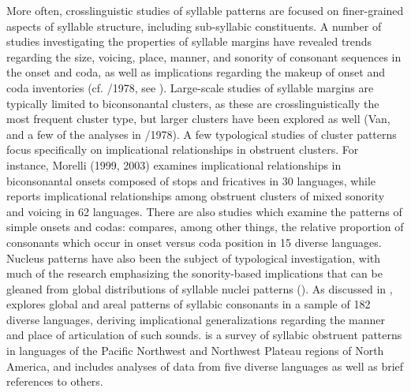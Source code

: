   More often, crosslinguistic studies of syllable patterns are focused on finer-grained aspects of syllable structure, including sub-syllabic constituents. A number of studies investigating the properties of syllable margins have revealed trends regarding the size, voicing, place, manner, and sonority of consonant sequences in the onset and coda, as well as implications regarding the makeup of onset and coda inventories (cf. \citealt{Greenberg1965}/1978, see ). Large-scale studies of syllable margins are typically limited to biconsonantal clusters, as these are crosslinguistically the most frequent cluster type, but larger clusters have been explored as well (Van\citealt{Dam2004}, and a few of the analyses in \citealt{Greenberg1965}/1978). A few typological studies of cluster patterns focus specifically on implicational relationships in obstruent clusters. For instance, Morelli (1999, 2003) examines implicational relationships in biconsonantal onsets composed of stops and fricatives in 30 languages, while \citet{Kreitman2008} reports implicational relationships among obstruent clusters of mixed sonority and voicing in 62 languages. There are also studies which examine the patterns of simple onsets and codas: \citet{Rousset2004} compares, among other things, the relative proportion of consonants which occur in onset versus coda position in 15 diverse languages. Nucleus patterns have also been the subject of typological investigation, with much of the research emphasizing the sonority-based implications that can be gleaned from global distributions of syllable nuclei patterns (\citealt{Blevins1995,Zec2007}). As discussed in , \citet{Bell1978a} explores global and areal patterns of syllabic consonants in a sample of 182 diverse languages, deriving implicational generalizations regarding the manner and place of articulation of such sounds. \citet{Hoard1978} is a survey of syllabic obstruent patterns in languages of the Pacific Northwest and Northwest Plateau regions of North America, and includes analyses of data from five diverse languages as well as brief references to others.


